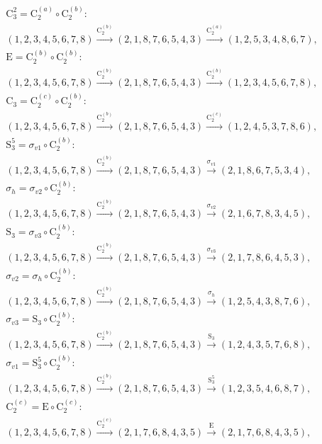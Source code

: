 \begin{align*}
& \mathrm{C}_{3}^{2} = \mathrm{C}_{2}^{(a)} \circ \mathrm{C}_{2}^{(b)}:\; \\& (1,2,3,4,5,6,7,8) \xrightarrow{\mathrm{C}_{2}^{(b)}} (2,1,8,7,6,5,4,3) \xrightarrow{\mathrm{C}_{2}^{(a)}} (1,2,5,3,4,8,6,7), \\
& \mathrm{E} = \mathrm{C}_{2}^{(b)} \circ \mathrm{C}_{2}^{(b)}:\; \\& (1,2,3,4,5,6,7,8) \xrightarrow{\mathrm{C}_{2}^{(b)}} (2,1,8,7,6,5,4,3) \xrightarrow{\mathrm{C}_{2}^{(b)}} (1,2,3,4,5,6,7,8), \\
& \mathrm{C}_{3} = \mathrm{C}_{2}^{(c)} \circ \mathrm{C}_{2}^{(b)}:\; \\& (1,2,3,4,5,6,7,8) \xrightarrow{\mathrm{C}_{2}^{(b)}} (2,1,8,7,6,5,4,3) \xrightarrow{\mathrm{C}_{2}^{(c)}} (1,2,4,5,3,7,8,6), \\
& \mathrm{S}_{3}^{5} = \sigma_{v1} \circ \mathrm{C}_{2}^{(b)}:\; \\& (1,2,3,4,5,6,7,8) \xrightarrow{\mathrm{C}_{2}^{(b)}} (2,1,8,7,6,5,4,3) \xrightarrow{\sigma_{v1}} (2,1,8,6,7,5,3,4), \\
& \sigma_{h} = \sigma_{v2} \circ \mathrm{C}_{2}^{(b)}:\; \\& (1,2,3,4,5,6,7,8) \xrightarrow{\mathrm{C}_{2}^{(b)}} (2,1,8,7,6,5,4,3) \xrightarrow{\sigma_{v2}} (2,1,6,7,8,3,4,5), \\
& \mathrm{S}_{3} = \sigma_{v3} \circ \mathrm{C}_{2}^{(b)}:\; \\& (1,2,3,4,5,6,7,8) \xrightarrow{\mathrm{C}_{2}^{(b)}} (2,1,8,7,6,5,4,3) \xrightarrow{\sigma_{v3}} (2,1,7,8,6,4,5,3), \\
& \sigma_{v2} = \sigma_{h} \circ \mathrm{C}_{2}^{(b)}:\; \\& (1,2,3,4,5,6,7,8) \xrightarrow{\mathrm{C}_{2}^{(b)}} (2,1,8,7,6,5,4,3) \xrightarrow{\sigma_{h}} (1,2,5,4,3,8,7,6), \\
& \sigma_{v3} = \mathrm{S}_{3} \circ \mathrm{C}_{2}^{(b)}:\; \\& (1,2,3,4,5,6,7,8) \xrightarrow{\mathrm{C}_{2}^{(b)}} (2,1,8,7,6,5,4,3) \xrightarrow{\mathrm{S}_{3}} (1,2,4,3,5,7,6,8), \\
& \sigma_{v1} = \mathrm{S}_{3}^{5} \circ \mathrm{C}_{2}^{(b)}:\; \\& (1,2,3,4,5,6,7,8) \xrightarrow{\mathrm{C}_{2}^{(b)}} (2,1,8,7,6,5,4,3) \xrightarrow{\mathrm{S}_{3}^{5}} (1,2,3,5,4,6,8,7), \\
& \mathrm{C}_{2}^{(c)} = \mathrm{E} \circ \mathrm{C}_{2}^{(c)}:\; \\& (1,2,3,4,5,6,7,8) \xrightarrow{\mathrm{C}_{2}^{(c)}} (2,1,7,6,8,4,3,5) \xrightarrow{\mathrm{E}} (2,1,7,6,8,4,3,5), \\

\end{align*}
